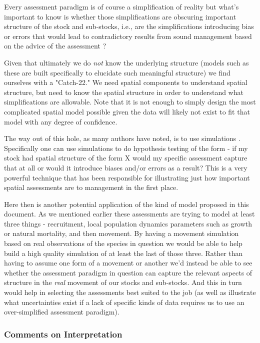 \documentclass[11pt]{article}
\begin{document}
Every assessment paradigm is of course a simplification of reality but what's important to know is whether those simplifications are obscuring important structure of the stock and sub-stocks, i.e., are the simplifications introducing bias or errors that would lead to contradictory results from sound management based on the advice of the assessment \cite{cadrin2020}? 

Given that ultimately we do \textit{not} know the underlying structure (models such as these are built specifically to elucidate such meaningful structure) we find ourselves with a "Catch-22." We need spatial components to understand spatial structure, but need to know the spatial structure in order to understand what simplifications are allowable. Note that it is not enough to simply design the most complicated spatial model possible given the data will likely not exist to fit that model with any degree of confidence. 

The way out of this hole, as many authors have noted, is to use simulations \cite{cadrin2020} \cite{goethel2023}. Specifically one can use simulations to do hypothesis testing of the form - if my stock had spatial structure of the form X would my specific assessment capture that at all or would it introduce biases and/or errors as a result? This is a very powerful technique that has been responsible for illustrating just how important spatial assessments are to management in the first place.\newline

Here then is another potential application of the kind of model proposed in this document. As we mentioned earlier these assessments are trying to model at least three things - recruitment, local population dynamics parameters such as growth or natural mortality, and then movement. By having a movement simulation based on real observations of the species in question we would be able to help build a high quality simulation of at least the last of those three. Rather than having to assume one form of a movement or another we'd instead be able to see whether the assessment paradigm in question can capture the relevant aspects of structure in the \textit{real} movement of our stocks and sub-stocks. And this in turn would help in selecting the assessments best suited to the job (as well as illustrate what uncertainties exist if a lack of specific kinds of data requires us to use an over-simplified assessment paradigm). 

\subsubsection{Comments on Interpretation}
\end{document}
